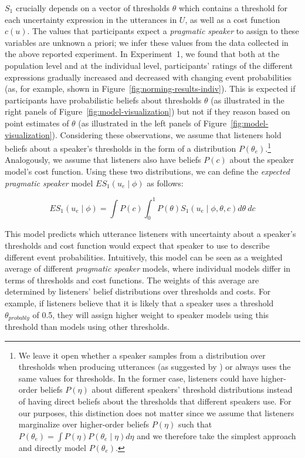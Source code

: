 \documentclass[man, floatsintext]{apa6}
\begin{document}
$S_1$ crucially depends on a vector of thresholds $\theta$ which contains a threshold for each uncertainty expression in the utterances in $U$, 
as well as a cost function $c(u)$. The values that participants expect a \textit{pragmatic speaker} to assign 
to these variables are unknown a priori; we infer these values from the data collected in the above reported experiment. 
In Experiment~1, we found that both at the population level and at the individual level, 
participants' ratings of the different expressions gradually increased and decreased with changing event probabilities 
(as, for example, shown in Figure~\ref{fig:norming-results-indiv}). This is expected if participants
have probabilistic beliefs about thresholds $\theta$ (as illustrated in the right panels of Figure~\ref{fig:model-visualization}) but not if they reason based on point estimates of $\theta$ (as illustrated in the left panels of Figure~\ref{fig:model-visualization}).
Considering these observations,  we assume that listeners hold beliefs about a speaker's thresholds in the form of a distribution $P\left(\theta_e\right)$.\footnote{We leave it open 
whether a {speaker} samples from a distribution over thresholds when producing utterances (as suggested by \textcite{Qing2015}) 
or always uses the same values for thresholds. In the former case, listeners could have higher-order beliefs  $P(\eta)$ 
about different {speakers}' threshold distributions instead of having direct beliefs about the thresholds that different 
{speakers} use. For our purposes, this distinction does not matter since we assume that listeners marginalize over higher-order beliefs $P(\eta)$ such that  $P\left(\theta_e\right) = \int P\left(\eta\right) P\left(\theta_e \mid \eta\right) d\eta$ and we therefore take the simplest approach and directly model $P\left(\theta_e\right)$. } Analogously, we assume that  listeners also have beliefs $P(c)$ about the speaker model's cost function.
Using these two distributions, we can define the \textit{expected pragmatic speaker} model $ES_1\left(u_e \mid \phi \right)$ as follows:

$$ES_1\left(u_e \mid \phi \right) = \int P(c) \int_0^1 P(\theta) S_1\left(u _e\mid \phi, \theta, c\right) d\theta \  d c$$

This model predicts which utterance listeners with uncertainty about a speaker's thresholds and cost function would expect that {speaker} to use to describe different event probabilities. 
Intuitively, this model can be seen as a weighted average of different \textit{pragmatic speaker} models, where individual models differ in terms of thresholds and cost functions.  The weights of this average are determined by listeners' belief distributions over thresholds and costs. For example, if listeners believe that it is likely that a speaker uses a threshold $\theta_{probably}$ of 0.5, they will assign higher weight to speaker models
using this threshold than models using other thresholds. 
\end{document}
